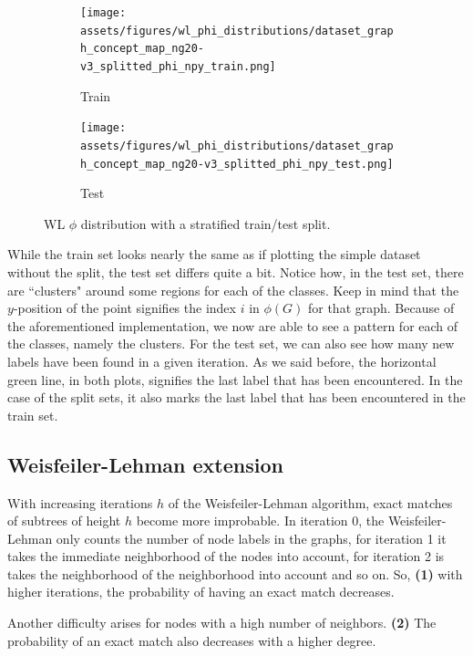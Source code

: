 \begin{figure}[htb!]
	\begin{subfigure}[t]{.49\linewidth}%
		{\texttt{[image: assets/figures/wl\_phi\_distributions/dataset\_graph\_concept\_map\_ng20-v3\_splitted\_phi\_npy\_train.png]}}\caption{Train}%
	\end{subfigure}%
	\begin{subfigure}[t]{.49\linewidth}%
		{\texttt{[image: assets/figures/wl\_phi\_distributions/dataset\_graph\_concept\_map\_ng20-v3\_splitted\_phi\_npy\_test.png]}}\caption{Test}%
	\end{subfigure}%
	\caption[Diagram: $\phi$ distribution plot for \textit{ng20}.]{WL $\phi$ distribution with a stratified train/test split.}%
	\label{fig:phi_distribution_train_test}
\end{figure}

While the train set looks nearly the same as if plotting the simple dataset without the split, the test set differs quite a bit.
Notice how, in the test set, there are ``clusters" around some regions for each of the classes. 
Keep in mind that the $y$-position of the point signifies the index $i$ in $\phi(G)$ for that graph.
Because of the aforementioned implementation, we now are able to see a pattern for each of the classes, namely the clusters.
For the test set, we can also see how many new labels have been found in a given iteration.
As we said before, the horizontal green line, in both plots, signifies the last label that has been encountered.
In the case of the split sets, it also marks the last label that has been encountered in the train set.


\subsection{Weisfeiler-Lehman extension}
With increasing iterations $h$ of the Weisfeiler-Lehman algorithm, exact matches of subtrees of height $h$ become more improbable.
In iteration 0, the Weisfeiler-Lehman only counts the number of node labels in the graphs, for iteration 1 it takes the immediate neighborhood of the nodes into account, for iteration 2 is takes the neighborhood of the neighborhood into account and so on.
So, \textbf{(1)} with higher iterations, the probability of having an exact match decreases.

Another difficulty arises for nodes with a high number of neighbors. \textbf{(2)} The probability of an exact match also decreases with a higher degree.

